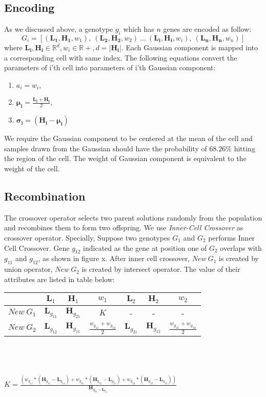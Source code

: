 \documentclass[conference]{IEEEtran}
\renewcommand{\vec}[1]{\mathbf{#1}}
\begin{document}
\subsection{Encoding}
As we discussed above, a genotype \(g_i\) which has \(n\) genes are encoded as follow: 
\[G_i=[(\vec{L_1},\vec{H_1},w_1),\ (\vec{L_2},\vec{H_2},w_2)\ ...\ (\vec{L_i},\vec{H_i},w_i),\ (\vec{L_n},\vec{H_n},w_n)]\]
where \(\vec{L_i},\vec{H_i} \in \mathbb{R}^d, w_i \in \mathbb{R+}, d = |\vec{H_i}|\).
Each Gaussian component is mapped into a corresponding cell with same index. The following equations convert the parameters of i'th cell into parameters of i'th Gaussian component:
\begin{enumerate}
	\item \(a_i = w_i\),
	\item \(\vec{\mu_i} = \frac{\vec{L_i}+\vec{H_i}}{2}\),
	\item \(\vec{\sigma_i} = (\vec{H_i} - \vec{\mu_i})\)\\
\end{enumerate}
We require the Gaussian component to be centered at the mean of the cell and samples drawn from the Gaussian should have the probability of \(68.26\%\) hitting the region of the cell. The weight of Gaussian component is equivalent to the weight of the cell.
\subsection{Recombination}
The crossover operator selects two parent solutions randomly from the population and recombines them to form two offspring. We use \emph{Inner-Cell Crossover} as crossover operator.
Specially, Suppose two genotypes \(G_1\) and \(G_2\) performs Inner Cell Crossover. Gene \(g_{12}\) indicated as the gene at position one of \(G_2\) overlaps with \(g_{11}\) and  \(g_{12}\), as shown in figure{ x}. After inner cell crossover, \(New\ G_1\) is created by union operator, \(New\ G_2\) is created by intersect operator. The value of their attributes are listed in table below:
\begin{center}
	\begin{tabular}{ | c | c | c | c | c | c | c |}
		\hline
		 &\(\vec{L}_1\)& \(\vec{H}_1\) & \(w_1\) & \(\vec{L}_2\) & \(\vec{H}_2\) & \(w_2\) \\ \hline
		\(New\ G_1\) & \(\vec{L}_{g_{11}}\) & \(\vec{H}_{g_{21}}\) & \(K\) &  -&  -& -\\ \hline
		\(New\ G_2\) & \(\vec{L}_{g_{12}}\) & \(\vec{H}_{g_{11}}\) & \(\frac{w_{g_{11}} + w_{g_{12}}}{2}\) & \(\vec{L}_{g_{21}}\) & \(\vec{H}_{g_{12}}\) & \(\frac{w_{g_{21}} + w_{g_{12}}}{2}\) \\ \hline
		\hline
	\end{tabular}
\ \\ \ \\ \ \\
\(
K = \frac{(w_{g_{11}}*(\vec{H}_{g_{11}} - \vec{L}_{g_{11}}) + 
	w_{g_{21}}*(\vec{H}_{g_{21}} - \vec{L}_{g_{21}}) + 
	w_{g_{12}}*(\vec{H}_{g_{12}} - \vec{L}_{g_{12}}))}{\vec{H}_{g_{21} - \vec{L}_{g_{11}}}}
\)
\end{center} 
\end{document}
